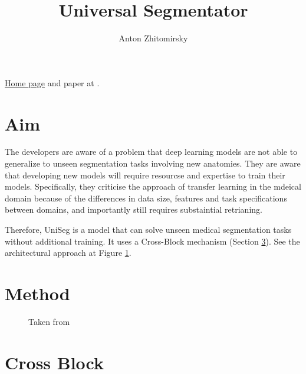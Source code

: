 \documentclass[11pt]{article}
\title{Universal Segmentator}
\author{Anton Zhitomirsky}
\begin{document}
\maketitle

\href{https://universeg.csail.mit.edu/}{Home page} and paper at \cite{universeg}.

\section{Aim}

The developers are aware of a problem that deep learning models are not able to generalize to unseen segmentation tasks involving new anatomies. They are aware that developing new models will require resourcse and expertise to train their models. Specifically, they criticise the approach of transfer learning in the mdeical domain because of the differences in data size, features and task specifications between domains, and importantly still requires substaintial retrianing. 

\vspace{1em}

Therefore, UniSeg is a model that can solve unseen medical segmentation tasks without additional training. It uses a Cross-Block mechanism (Section \ref{sec:cross-block}). See the architectural approach at Figure \ref{fig:arch-comparison}.

\section{Method}

\begin{figure}[H]
    \centering
    \caption{Taken from \cite{universeg}}\label{fig:arch-comparison}
\end{figure}



\section{Cross Block} \label{sec:cross-block}

\printbibliography
\end{document}
